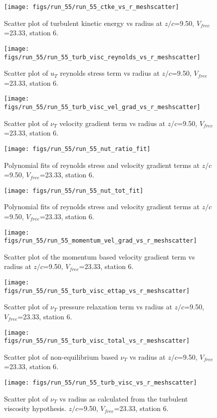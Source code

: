 \begin{figure}[H]
\centering
\texttt{[image: figs/run\_55/run\_55\_ctke\_vs\_r\_meshscatter]}
\caption{Scatter plot of turbulent kinetic energy vs radius at $z/c$=9.50, $V_{free}$=23.33, station 6.}
\end{figure}


\begin{figure}[H]
\centering
\texttt{[image: figs/run\_55/run\_55\_turb\_visc\_reynolds\_vs\_r\_meshscatter]}
\caption{Scatter plot of $
u_T$ reynolds stress term vs radius at $z/c$=9.50, $V_{free}$=23.33, station 6.}
\end{figure}


\begin{figure}[H]
\centering
\texttt{[image: figs/run\_55/run\_55\_turb\_visc\_vel\_grad\_vs\_r\_meshscatter]}
\caption{Scatter plot of $\nu_T$ velocity gradient term vs radius at $z/c$=9.50, $V_{free}$=23.33, station 6.}
\end{figure}


\begin{figure}[H]
\centering
\texttt{[image: figs/run\_55/run\_55\_nut\_ratio\_fit]}
\caption{Polynomial fits of reynolds stress and velocity gradient terms at $z/c$=9.50, $V_{free}$=23.33, station 6.}
\end{figure}


\begin{figure}[H]
\centering
\texttt{[image: figs/run\_55/run\_55\_nut\_tot\_fit]}
\caption{Polynomial fits of reynolds stress and velocity gradient terms at $z/c$=9.50, $V_{free}$=23.33, station 6.}
\end{figure}


\begin{figure}[H]
\centering
\texttt{[image: figs/run\_55/run\_55\_momentum\_vel\_grad\_vs\_r\_meshscatter]}
\caption{Scatter plot of the momentum based velocity gradient term vs radius at $z/c$=9.50, $V_{free}$=23.33, station 6.}
\end{figure}


\begin{figure}[H]
\centering
\texttt{[image: figs/run\_55/run\_55\_turb\_visc\_ettap\_vs\_r\_meshscatter]}
\caption{Scatter plot of $\nu_T$ pressure relaxation term vs radius at $z/c$=9.50, $V_{free}$=23.33, station 6.}
\end{figure}


\begin{figure}[H]
\centering
\texttt{[image: figs/run\_55/run\_55\_turb\_visc\_total\_vs\_r\_meshscatter]}
\caption{Scatter plot of non-equilibrium based $\nu_T$ vs radius at $z/c$=9.50, $V_{free}$=23.33, station 6.}
\end{figure}


\begin{figure}[H]
\centering
\texttt{[image: figs/run\_55/run\_55\_turb\_visc\_vs\_r\_meshscatter]}
\caption{Scatter plot of $\nu_T$ vs radius as calculated from the turbulent viscosity hypothesis. $z/c$=9.50, $V_{free}$=23.33, station 6.}
\end{figure}


